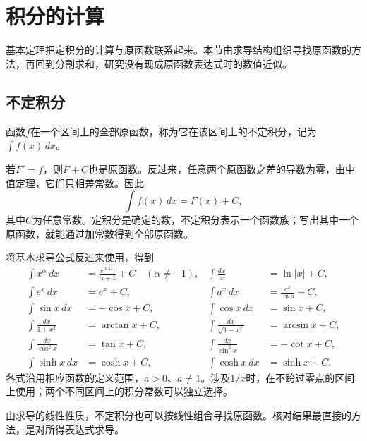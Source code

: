 \FloatBarrier
\newpage
\section{积分的计算}
\label{sec:calculus-integration-methods}

\begingroup
\setlength{\parskip}{3pt}
\setlength{\abovedisplayskip}{10pt}
\setlength{\belowdisplayskip}{10pt}

基本定理把定积分的计算与原函数联系起来。本节由求导结构组织寻找原函数的方法，再回到分割求和，研究没有现成原函数表达式时的数值近似。

\subsection{不定积分}

\begin{definition}
函数\(f\)在一个区间上的全部原函数，称为它在该区间上的{\heiti{}不定积分}，记为\(\int f(x)\,dx\)。
\end{definition}

若\(F'=f\)，则\(F+C\)也是原函数。反过来，任意两个原函数之差的导数为零，由中值定理，它们只相差常数。因此
\begin{equation*}
 \int f(x)\,dx=F(x)+C,
\end{equation*}
其中\(C\)为任意常数。定积分是确定的数，不定积分表示一个函数族；写出其中一个原函数，就能通过加常数得到全部原函数。

将基本求导公式反过来使用，得到
\begin{equation*}
 \begin{aligned}
 \int x^\alpha\,dx&=\frac{x^{\alpha+1}}{\alpha+1}+C\quad(\alpha\ne-1),&
 \int\frac{dx}{x}&=\ln|x|+C,\\
 \int e^x\,dx&=e^x+C,&\int a^x\,dx&=\frac{a^x}{\ln a}+C,\\
 \int\sin x\,dx&=-\cos x+C,&\int\cos x\,dx&=\sin x+C,\\
 \int\frac{dx}{1+x^2}&=\arctan x+C,&
 \int\frac{dx}{\sqrt{1-x^2}}&=\arcsin x+C,\\
 \int\frac{dx}{\cos^2x}&=\tan x+C,&
 \int\frac{dx}{\sin^2x}&=-\cot x+C,\\
 \int\sinh x\,dx&=\cosh x+C,&\int\cosh x\,dx&=\sinh x+C.
 \end{aligned}
\end{equation*}
各式沿用相应函数的定义范围，\(a>0\)、\(a\ne1\)。涉及\(1/x\)时，在不跨过零点的区间上使用；两个不同区间上的积分常数可以独立选择。

由求导的线性性质，不定积分也可以按线性组合寻找原函数。核对结果最直接的方法，是对所得表达式求导。

